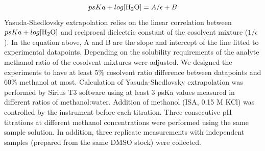\documentclass[9pt,lineno]{elife}
\begin{document}
$$ psKa + log [\ce{H2O}]=A/\epsilon+B $$
Yasuda-Shedlovsky extrapolation relies on the linear correlation between $psKa + log [\ce{H2O}]$ and reciprocal dielectric constant of the cosolvent mixture ($1/\epsilon$). In the equation above, A and B are the slope and intercept of the line fitted to experimental datapoints.  Depending on the solubility requirements of the analyte methanol ratio of the cosolvent mixtures were adjusted. We designed the experiments to have at least 5\% cosolvent ratio difference between datapoints and 60\% methanol at most. Calculation of Yasuda-Shedlovsky extrapolation was performed by Sirius T3 software using at least 3 psKa values measured in different ratios of methanol:water.
Addition of methanol (ISA, 0.15 M KCl) was controlled by the instrument before each titration. Three consecutive pH titrations at different methanol concentrations were performed using the same sample solution. In addition, three replicate measurements with independent samples (prepared from the same DMSO stock) were collected.
\end{document}

